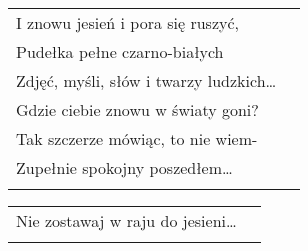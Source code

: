 \documentclass[a5paper]{article}
\begin{document}
\noindent
\begin{tabular}{@{}p{7.00cm}p{3cm}@{}}
I znowu jesień i pora się ruszyć, \\
Pudełka pełne czarno-białych \\
Zdjęć, myśli, słów i twarzy ludzkich… \\
Gdzie ciebie znowu w światy goni? \\
Tak szczerze mówiąc, to nie wiem- \\
Zupełnie spokojny poszedłem… \\ \\
\end{tabular}

\noindent
\begin{tabular}{@{}p{7.00cm}p{3cm}@{}}
Nie zostawaj w raju do jesieni… \\ \\
\end{tabular}
\end{document}
